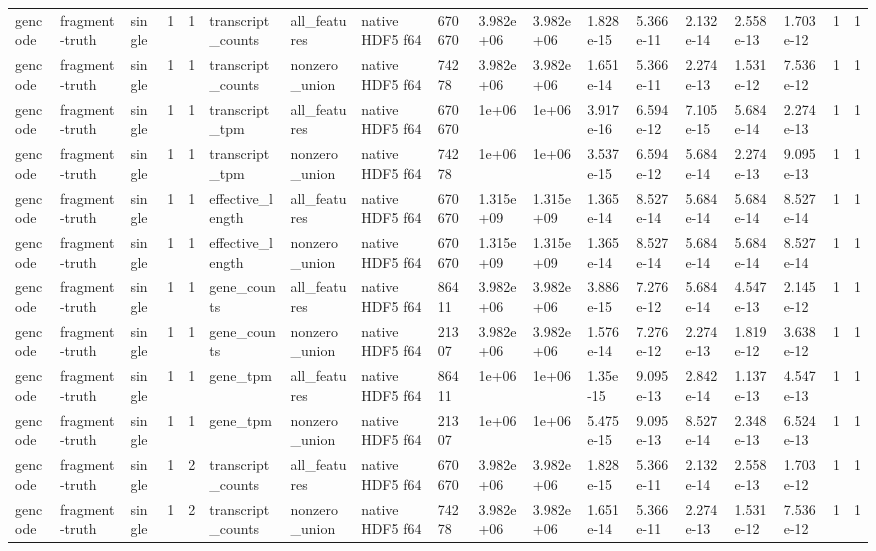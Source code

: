 \begin{tabular}{llllllllllllllllll}
gencode & fragment-truth & single & 1 & 1 & transcript\_counts & all\_features & native HDF5 f64 & 670670 & 3.982e+06 & 3.982e+06 & 1.828e-15 & 5.366e-11 & 2.132e-14 & 2.558e-13 & 1.703e-12 & 1 & 1 \\
gencode & fragment-truth & single & 1 & 1 & transcript\_counts & nonzero\_union & native HDF5 f64 & 74278 & 3.982e+06 & 3.982e+06 & 1.651e-14 & 5.366e-11 & 2.274e-13 & 1.531e-12 & 7.536e-12 & 1 & 1 \\
gencode & fragment-truth & single & 1 & 1 & transcript\_tpm & all\_features & native HDF5 f64 & 670670 & 1e+06 & 1e+06 & 3.917e-16 & 6.594e-12 & 7.105e-15 & 5.684e-14 & 2.274e-13 & 1 & 1 \\
gencode & fragment-truth & single & 1 & 1 & transcript\_tpm & nonzero\_union & native HDF5 f64 & 74278 & 1e+06 & 1e+06 & 3.537e-15 & 6.594e-12 & 5.684e-14 & 2.274e-13 & 9.095e-13 & 1 & 1 \\
gencode & fragment-truth & single & 1 & 1 & effective\_length & all\_features & native HDF5 f64 & 670670 & 1.315e+09 & 1.315e+09 & 1.365e-14 & 8.527e-14 & 5.684e-14 & 5.684e-14 & 8.527e-14 & 1 & 1 \\
gencode & fragment-truth & single & 1 & 1 & effective\_length & nonzero\_union & native HDF5 f64 & 670670 & 1.315e+09 & 1.315e+09 & 1.365e-14 & 8.527e-14 & 5.684e-14 & 5.684e-14 & 8.527e-14 & 1 & 1 \\
gencode & fragment-truth & single & 1 & 1 & gene\_counts & all\_features & native HDF5 f64 & 86411 & 3.982e+06 & 3.982e+06 & 3.886e-15 & 7.276e-12 & 5.684e-14 & 4.547e-13 & 2.145e-12 & 1 & 1 \\
gencode & fragment-truth & single & 1 & 1 & gene\_counts & nonzero\_union & native HDF5 f64 & 21307 & 3.982e+06 & 3.982e+06 & 1.576e-14 & 7.276e-12 & 2.274e-13 & 1.819e-12 & 3.638e-12 & 1 & 1 \\
gencode & fragment-truth & single & 1 & 1 & gene\_tpm & all\_features & native HDF5 f64 & 86411 & 1e+06 & 1e+06 & 1.35e-15 & 9.095e-13 & 2.842e-14 & 1.137e-13 & 4.547e-13 & 1 & 1 \\
gencode & fragment-truth & single & 1 & 1 & gene\_tpm & nonzero\_union & native HDF5 f64 & 21307 & 1e+06 & 1e+06 & 5.475e-15 & 9.095e-13 & 8.527e-14 & 2.348e-13 & 6.524e-13 & 1 & 1 \\
gencode & fragment-truth & single & 1 & 2 & transcript\_counts & all\_features & native HDF5 f64 & 670670 & 3.982e+06 & 3.982e+06 & 1.828e-15 & 5.366e-11 & 2.132e-14 & 2.558e-13 & 1.703e-12 & 1 & 1 \\
gencode & fragment-truth & single & 1 & 2 & transcript\_counts & nonzero\_union & native HDF5 f64 & 74278 & 3.982e+06 & 3.982e+06 & 1.651e-14 & 5.366e-11 & 2.274e-13 & 1.531e-12 & 7.536e-12 & 1 & 1 \\

\end{tabular}
